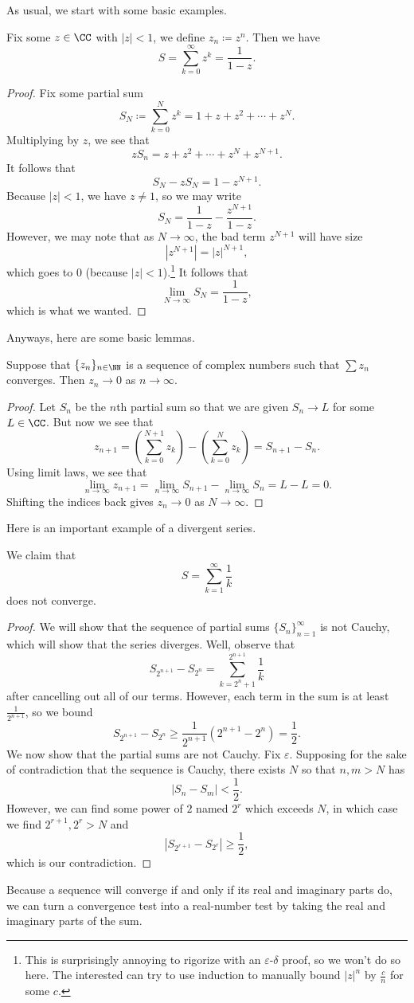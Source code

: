 As usual, we start with some basic examples.
\begin{exe}
	Fix some $z\in\CC$ with $|z|<1$, we define $z_n\coloneqq z^n$. Then we have
	\[S=\sum_{k=0}^\infty z^k=\frac1{1-z}.\]
\end{exe}
\begin{proof}
	Fix some partial sum
	\[S_N\coloneqq\sum_{k=0}^Nz^k=1+z+z^2+\cdots+z^N.\]
	Multiplying by $z$, we see that
	\[zS_n=z+z^2+\cdots+ z^N+z^{N+1}.\]
	It follows that
	\[S_N-zS_N=1-z^{N+1}.\]
	Because $|z|<1$, we have $z\ne1$, so we may write
	\[S_N=\frac1{1-z}-\frac{z^{N+1}}{1-z}.\]
	However, we may note that as $N\to\infty$, the bad term $z^{N+1}$ will have size
	\[\left|z^{N+1}\right|=|z|^{N+1},\]
	which goes to $0$ (because $|z|<1$).\footnote{This is surprisingly annoying to rigorize with an $\varepsilon$-$\delta$ proof, so we won't do so here. The interested can try to use induction to manually bound $|z|^n$ by $\frac cn$ for some $c$.} It follows that
	\[\lim_{N\to\infty}S_N=\frac1{1-z},\]
	which is what we wanted.
\end{proof}
Anyways, here are some basic lemmas.
\begin{lemma} \label{lem:divtest}
	Suppose that $\{z_n\}_{n\in\NN}$ is a sequence of complex numbers such that $\sum z_n$ converges. Then $z_n\to0$ as $n\to\infty$.
\end{lemma}
\begin{proof}
	Let $S_n$ be the $n$th partial sum so that we are given $S_n\to L$ for some $L\in\CC$. But now we see that
	\[z_{n+1}=\left(\sum_{k=0}^{N+1}z_k\right)-\left(\sum_{k=0}^{N}z_k\right)=S_{n+1}-S_n.\]
	Using limit laws, we see that
	\[\lim_{n\to\infty}z_{n+1}=\lim_{n\to\infty}S_{n+1}-\lim_{n\to\infty}S_n=L-L=0.\]
	Shifting the indices back gives $z_n\to0$ as $N\to\infty$.
\end{proof}
Here is an important example of a divergent series.
\begin{exe}
	We claim that
	\[S=\sum_{k=1}^\infty\frac1k\]
	does not converge.
\end{exe}
\begin{proof}
	We will show that the sequence of partial sums $\{S_n\}_{n=1}^\infty$ is not Cauchy, which will show that the series diverges. Well, observe that
	\[S_{2^{n+1}}-S_{2^n}=\sum_{k=2^n+1}^{2^{n+1}}\frac1k\]
	after cancelling out all of our terms. However, each term in the sum is at least $\frac1{2^{n+1}}$, so we bound
	\[S_{2^{n+1}}-S_{2^n}\ge\frac1{2^{n+1}}\left(2^{n+1}-2^n\right)=\frac12.\]
	We now show that the partial sums are not Cauchy. Fix $\varepsilon$. Supposing for the sake of contradiction that the sequence is Cauchy, there exists $N$ so that $n,m>N$ has
	\[|S_n-S_m|<\frac12.\]
	However, we can find some power of $2$ named $2^r$ which exceeds $N$, in which case we find $2^{r+1},2^r>N$ and
	\[|S_{2^{r+1}}-S_{2^r}|\ge\frac12,\]
	which is our contradiction.
\end{proof}
\begin{remark}
	Because a sequence will converge if and only if its real and imaginary parts do, we can turn a convergence test into a real-number test by taking the real and imaginary parts of the sum.
\end{remark}


